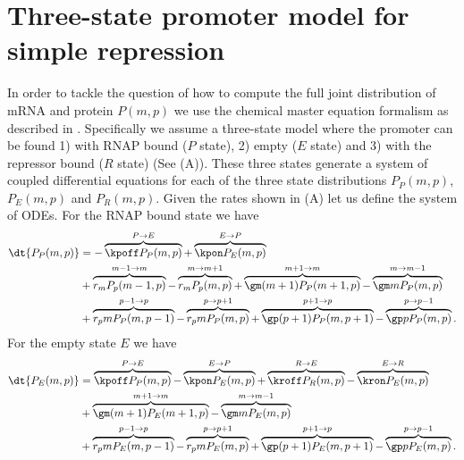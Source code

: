 \section{Three-state promoter model for simple repression}

In order to tackle the question of how to compute the full joint distribution of
mRNA and protein $P(m, p)$ we use the chemical master equation formalism as
described in . Specifically we assume a three-state model
where the promoter can be found 1) with RNAP bound ($P$ state), 2) empty ($E$
state) and 3) with the repressor bound ($R$ state) (See
(A)). These three states generate a system of coupled
differential equations for each of the three state distributions $P_P(m, p)$,
$P_E(m, p)$ and $P_R(m, p)$. Given the rates shown in
(A) let us define the system of ODEs. For the RNAP
bound state we have
\begin{equation}
  \begin{aligned}
    \dt{P_P(m, p)} &=
    - \overbrace{\kpoff P_P(m, p)}^{P \rightarrow E} %
    + \overbrace{\kpon P_E(m, p)}^{E \rightarrow P}\\ %
    &+ \overbrace{r_m P_p(m-1, p)}^{m-1 \rightarrow m} %
    - \overbrace{r_m P_p(m, p)}^{m \rightarrow m+1}%
    + \overbrace{\gm (m + 1) P_P(m+1 , p)}^{m+1 \rightarrow m} %
    - \overbrace{\gm m P_P(m , p)}^{m \rightarrow m-1}\\ %
    &+ \overbrace{r_p m P_P(m, p - 1)}^{p-1 \rightarrow p} %
    - \overbrace{r_p m P_P(m, p)}^{p \rightarrow p+1} %
    + \overbrace{\gp (p + 1) P_P(m, p + 1)}^{p + 1 \rightarrow p} %
    - \overbrace{\gp p P_P(m, p)}^{p \rightarrow p-1}. %
  \end{aligned}
\end{equation}
For the empty state $E$ we have
\begin{equation}
  \begin{aligned}
    \dt{P_E(m, p)} &=
    \overbrace{\kpoff P_P(m, p)}^{P \rightarrow E} %
    - \overbrace{\kpon P_E(m, p)}^{E \rightarrow P} %
    + \overbrace{\kroff P_R(m, p)}^{R \rightarrow E} %
    - \overbrace{\kron P_E(m, p)}^{E \rightarrow R}\\ %
    &+ \overbrace{\gm (m + 1) P_E(m+1 , p)}^{m+1 \rightarrow m} %
    - \overbrace{\gm m P_E(m , p)}^{m \rightarrow m-1}\\ %
    &+ \overbrace{r_p m P_E(m, p - 1)}^{p-1 \rightarrow p} %
    - \overbrace{r_p m P_E(m, p)}^{p \rightarrow p+1} %
    + \overbrace{\gp (p + 1) P_E(m, p + 1)}^{p + 1 \rightarrow p} %
    - \overbrace{\gp p P_E(m, p)}^{p \rightarrow p-1}. %
  \end{aligned}
\end{equation}
